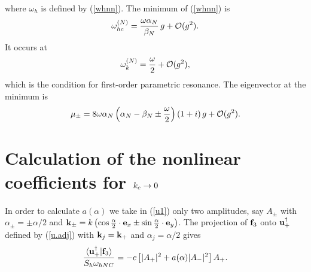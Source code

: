 where $\omega_h$ is defined by (\ref{whnn}). The minimum of 
(\ref{whnn}) is 
\begin{equation}
  \omega_{hc}^{(N)}=\frac{\omega\alpha_N}{\beta_N}\,g+{\cal O}(g^2).
  \label{whc}
\end{equation}
It occurs at 
\begin{equation}
  \omega_k^{(N)}=\frac{\omega}{2}+{\cal O}(g^2),
  \label{wkc}
\end{equation}
which is the condition for first-order parametric resonance. The
eigenvector at the minimum is
\begin{equation}
 \mu_\pm=8\omega\alpha_N\left(\alpha_N-\beta_N\pm\frac{\omega}{2}
   \right)(1+i)\,g+{\cal O}(g^2).
  \label{mu.pmc}
\end{equation}


\section{\protect\label{APC}Calculation of the nonlinear
coefficients for $\lowercase{k}_{\lowercase{c}}\to 0$}

In order to calculate $a(\alpha)$ we take in (\ref{u1}) only two
amplitudes, say $A_\pm$ with $\alpha_\pm=\pm\alpha/2$ and ${\bf
k}_\pm=k\left(\cos{\alpha\over 2}\cdot {\bf e}_x\pm\sin{\alpha\over
2}\cdot{\bf e}_y\right)$. The projection of ${\bf f}_3$ onto ${\bf
u}_+^\dagger$ defined by (\ref{u.adj}) with ${\bf k}_j={\bf k}_+$ and
$\alpha_j=\alpha/2$ gives 
\begin{equation}
  \frac{\langle{\bf u}_+^\dagger|{\bf f}_3\rangle}{S_h\omega_{hNC}}=
  -c\left[|A_+|^2+a(\alpha)|A_-|^2\right]A_+.
  \label{a3.proj}
\end{equation}

